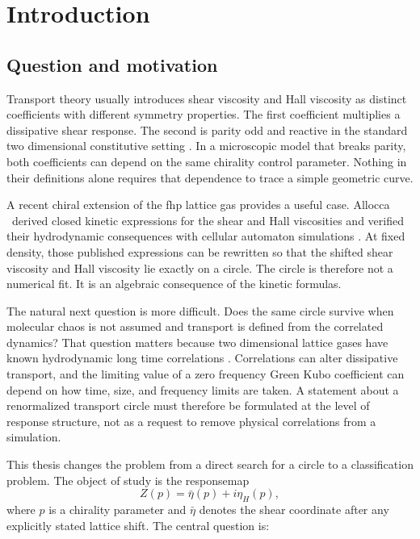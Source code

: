 \chapter{Introduction}\label{ch:introduction}

\section{Question and motivation}
Transport theory usually introduces shear viscosity and Hall viscosity as distinct coefficients with different symmetry properties. The first coefficient multiplies a dissipative shear response. The second is parity odd and reactive in the standard two dimensional constitutive setting \cite{Avron1998,Banerjee2017,FruchartReview2023}. In a microscopic model that breaks parity, both coefficients can depend on the same chirality control parameter. Nothing in their definitions alone requires that dependence to trace a simple geometric curve.

A recent chiral extension of the \gls{fhp} lattice gas provides a useful case. Allocca \etal\ derived closed kinetic expressions for the shear and Hall viscosities and verified their hydrodynamic consequences with cellular automaton simulations \cite{Allocca2026}. At fixed density, those published expressions can be rewritten so that the shifted shear viscosity and Hall viscosity lie exactly on a circle. The circle is therefore not a numerical fit. It is an algebraic consequence of the kinetic formulas.

The natural next question is more difficult. Does the same circle survive when molecular chaos is not assumed and transport is defined from the correlated dynamics? That question matters because two dimensional lattice gases have known hydrodynamic long time correlations \cite{Naitoh1990,ErnstDufty1989}. Correlations can alter dissipative transport, and the limiting value of a zero frequency Green Kubo coefficient can depend on how time, size, and frequency limits are taken. A statement about a renormalized transport circle must therefore be formulated at the level of response structure, not as a request to remove physical correlations from a simulation.

This thesis changes the problem from a direct search for a circle to a classification problem. The object of study is the \gls{responsemap}
\begin{equation}
 Z(p)=\bar\eta(p)+i\eta_H(p),
 \label{eq:intro_response}
\end{equation}
where $p$ is a chirality parameter and $\bar\eta$ denotes the shear coordinate after any explicitly stated lattice shift. The central question is:

